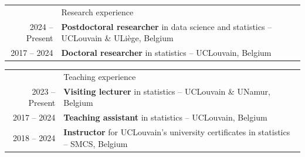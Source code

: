 \documentclass[letterpaper, 11pt]{article}
\newcommand{\headingfont}{\Large\color{OliveGreen}}
\newenvironment{SectionTable}[1]{
	\renewcommand*{\arraystretch}{1.7}
	\setlength{\tabcolsep}{10pt}
	\begin{longtable}{Rp{5.2in}} & #1 \\}
{\end{longtable}\vspace{-.3cm}}
\begin{document}







\begin{SectionTable}{\headingfont Research experience}

2024 -- Present &
\textbf{Postdoctoral researcher} in data science and statistics -- UCLouvain \& ULiège, Belgium \\

2017 -- 2024 &
\textbf{Doctoral researcher} in statistics -- UCLouvain, Belgium

\end{SectionTable}


\begin{SectionTable}{\headingfont Teaching experience}

2023 -- Present & 
\textbf{Visiting lecturer} in statistics -- UCLouvain \& UNamur, Belgium \\
2017 -- 2024 & 
\textbf{Teaching assistant} in statistics -- UCLouvain, Belgium \\
2018 -- 2024 & \textbf{Instructor} for UCLouvain's university certificates in statistics -- SMCS, Belgium

\end{SectionTable}
\end{document}
